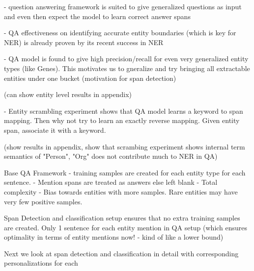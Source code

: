 
- question answering framework is suited to give generalized questions as input and even then expect the model to learn correct answer spans

- QA effectiveness on identifying accurate entity boundaries (which is key for NER) is already proven by its recent success in NER

- QA model is found to give high precision/recall for even very generalized entity types (like Genes). This motivates us to gneralize and try bringing all extractable entities under one bucket (motivation for span detection)

(can show entity level results in appendix)

- Entity scrambling experiment shows that QA model learns a keyword to span mapping. Then why not try to learn an exactly reverse mapping. Given entity span, associate it with a keyword.

(show results in appendix, show that scrambing experiment shows internal term semantics of "Person", "Org" does not contribute much to NER in QA)

Base QA Framework
- training samples are created for each entity type for each sentence. 
- Mention spans are treated as answers else left blank
- Total complexity 
- Bias towards entities with more samples. Rare entities may have very few positive samples.

Span Detection and classification setup ensures that no extra training samples are created. Only 1 sentence for each entity mention in QA setup (which ensures optimality in terms of entity mentions now! - kind of like a lower bound)

Next we look at span detection and classification in detail with corresponding personalizations for each

